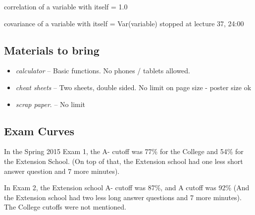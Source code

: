 \documentclass[11pt, oneside]{article}   	%
\begin{document}
correlation of a variable with itself = 1.0

covariance of a variable with itself = Var(variable)
stopped at lecture 37, 24:00

\subsection{Materials to bring}
\begin{itemize}
	\item \emph{calculator} -- Basic functions. No phones / tablets allowed.
	\item \emph{cheat sheets} -- Two sheets, double sided. No limit on page size - poster size ok
	\item \emph{scrap paper}. -- No limit
\end{itemize}

\subsection{Exam Curves}
In the Spring 2015 Exam 1, the A- cutoff was 77\% for the College and 54\% for the Extension School. (On top of that, the Extension school had one less short answer question and 7 more minutes).

In Exam 2, the Extension school A- cutoff was 87\%, and A cutoff was 92\% (And the Extension school had two less long answer questions and 7 more minutes). The College cutoffs were not mentioned.
\end{document}
